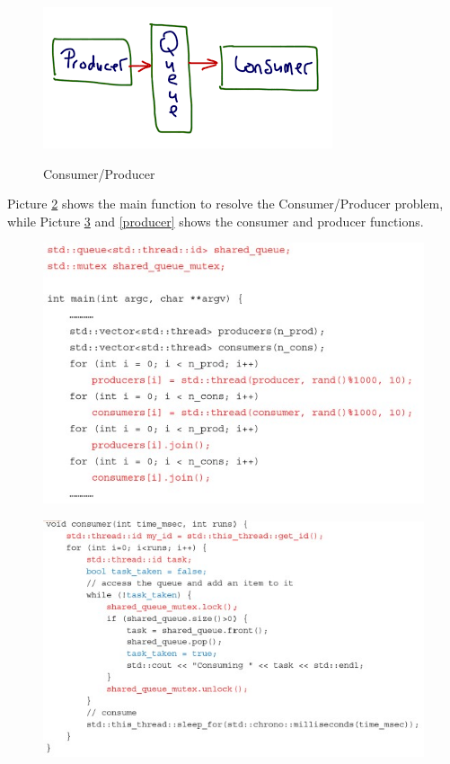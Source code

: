 \begin{figure}[h!]
		\centering
		\includegraphics[scale = 0.8]{img/consumer producer.png}
        \label{consumer_producer}
        \caption{Consumer/Producer}
\end{figure}

Picture \ref{main} shows the main function to resolve the Consumer/Producer problem, while Picture \ref{consumer} and \ref{producer} shows the consumer and producer functions.

\begin{figure}[h!]
		\centering
		\includegraphics[scale = 1.4]{img/cp_main.jpg}
        \label{main}
\end{figure}

\begin{figure}[h!]
		\centering
		\includegraphics[scale = 1.4]{img/cp_c.jpg}
        \label{consumer}
\end{figure}

